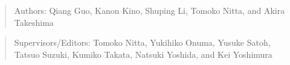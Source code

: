 
\begin{quotation}
  Authors:
  Qiang Guo,
  Kanon Kino,
  Shuping Li,
  Tomoko Nitta,
  and
  Akira Takeshima
\end{quotation}
\begin{quotation}
  Supervisors/Editors:
  Tomoko Nitta,
  Yukihiko Onuma,
  Yusuke Satoh,
  Tatsuo Suzuki,
  Kumiko Takata,
  Natsuki Yoshida,
  and
  Kei Yoshimura
\end{quotation}
